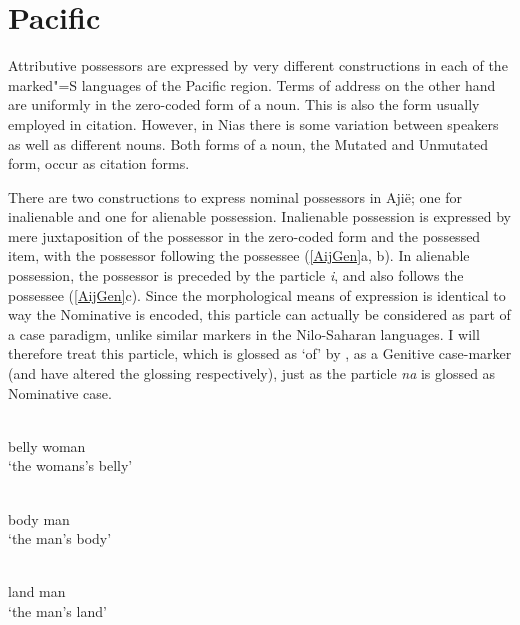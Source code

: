 \section{Pacific}\label{ExtraPac}

Attributive possessors are expressed by very different constructions in each of the marked"=S languages of the Pacific region.
Terms of address on the other hand are uniformly in the zero-coded form of a noun.
This is also the form usually employed in citation. 
However, in Nias there is some variation between speakers as well as different nouns.
Both forms of a noun, the Mutated and Unmutated form, occur as citation forms.
 


There are two constructions to express nominal possessors in Aji\"e; one for inalienable and one for alienable possession.
Inalienable possession is expressed by mere juxtaposition of the possessor in the zero-coded form and the possessed item, with the possessor following the possessee (\ref{AijGen}a, b). In alienable possession, the possessor is preceded by the particle \emph{i}, and also follows the possessee (\ref{AijGen}c).
Since the morphological means of expression is identical to way the Nominative is encoded, this particle can actually be considered as part of a case paradigm, unlike similar markers in the Nilo-Saharan languages. 
I will therefore treat this particle, which is glossed as `of' by \citet{Lichtenberk:1978}, as a Genitive case-marker (and have altered the glossing respectively), just as the particle \emph{na} is glossed as Nominative case. 

\begin{exe}\ex\label{AijGen}
\begin{xlist}
\ex\gll{} \textbf{}\\
belly woman\\
\glt `the womans's belly' %

\ex\gll{} \textbf{}\\
body man\\
\glt `the man's body' %

\ex\gll{} \textbf{} \\
land \gen{} man\\
\glt `the man's land' %
\end{xlist}
\end{exe}


